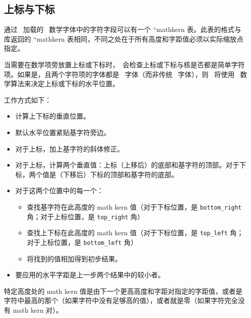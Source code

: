 \subsection{上标与下标}

通过 \LUA\ 加载的 \OPENTYPE\ 数学字体中的字符字段可以有一个 ``mathkern 表。此表的格式与  库返回的 ``mathkern 表相同，不同之处在于所有高度和字距值必须以实际缩放点指定。

当需要在数学项旁放置上标或下标时，\LUATEX\ 会检查上标或下标与核是否都是简单字符项。如果是，且两个字符项的字体都是 \OPENTYPE\ 字体（而非传统 \TEX\ 字体），则 \LUATEX\ 将使用 \OPENTYPE\ 数学算法来决定上标或下标的水平位置。

工作方式如下：

\begin{itemize}\item 计算上下标的垂直位置。
    
    \item 默认水平位置紧贴基字符旁边。
    
    \item 对于上标，加上基字符的斜体修正。
    
    \item 对于上标，计算两个垂直值：上标（上移后）的底部和基字符的顶部。对于下标，两个值是（下移后）下标的顶部和基字符的底部。
    
    \item 对于这两个位置中的每一个：
        \begin{itemize}\item 查找基字符在此高度的 math kern 值（对于下标位置，是 \texttt{bottom\_right} 角；对于上标位置，是 \texttt{top\_right} 角）

            \item 查找上下标在此高度的 math kern 值（对于下标位置，是 \texttt{top\_left} 角；对于上标位置，是 \texttt{bottom\_left} 角）
            
            \item 将找到的值相加得到初步结果。
            
        \end{itemize}
    
    \item 要应用的水平字距是上一步两个结果中的较小者。
    
\end{itemize}

特定高度处的 math kern 值是由下一个更高高度和字距对指定的字距值，或者是字符中最高的那个（如果字符中没有足够高的值），或者就是零（如果字符完全没有 math kern 对）。

